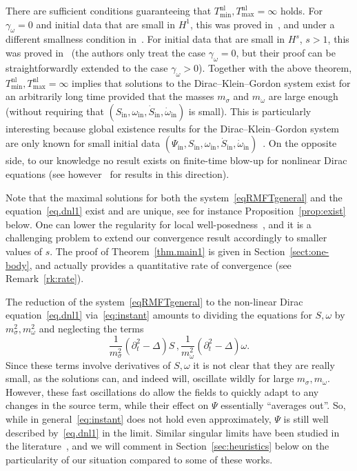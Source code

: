 \documentclass[10pt]{amsart}
\theoremstyle{definition}\newtheorem{defi}[theo]{Definition}\newtheorem{rema}[theo]{Remark}\newtheorem{exam}[theo]{Example}\newtheorem{exem}[theo]{Example}\newtheorem{nota}[theo]{Notation}
\newcommand{\rmin}{\mathrm{in}}
\newcommand{\nl}{\mathrm{nl}}
\begin{document}
There are sufficient conditions guaranteeing that $T_{\min}^{\nl}, T_{\max}^{\nl}=\infty$ holds. For $\gamma_\omega=0$ and initial data that are small in $H^1$, this was proved in~\cite{bejenaru2015}, and under a different smallness condition in~\cite{candy2018}. For initial data that are small in $H^s$, $s>1$, this was proved in~\cite{machihara2003} (the authors only treat the case $\gamma_\omega=0$, but their proof can be straightforwardly extended to the case $\gamma_\omega>0$). Together with the above theorem, $T_{\min}^{\nl}, T_{\max}^{\nl}=\infty$ implies that solutions to the Dirac--Klein--Gordon system exist for an arbitrarily long time provided that the masses $m_\sigma$ and $m_\omega$ are large enough (without requiring that $(S_\rmin,\omega_\rmin,\dot{S}_\rmin,\dot{\omega}_\rmin)$ is small). This is particularly interesting because global existence results for the Dirac--Klein--Gordon system are only known for small initial data $(\Psi_\rmin,S_\rmin,\omega_\rmin,\dot{S}_\rmin,\dot{\omega}_\rmin)$~\cite{bejenaru2017}. On the opposite side, to our knowledge no result exists on finite-time blow-up for nonlinear Dirac equations (see however~\cite{DanOka-16,HuhPel-19} for results in this direction).

Note that the maximal solutions for both the system~\eqref{eqRMFTgeneral} and the equation~\eqref{eq.dnl1} exist and are unique, see for instance Proposition~\ref{prop:exist} below. One can lower the regularity for local well-posedness~\cite{bejenaru2015,bejenaru2017,machihara2003}, and it is a challenging problem to extend our convergence result accordingly to smaller values of $s$. The proof of Theorem~\ref{thm.main1} is given in Section~\ref{sect:one-body}, and actually provides a quantitative rate of convergence (see Remark~\ref{rk:rate}).

The reduction of the system~\eqref{eqRMFTgeneral} to the non-linear Dirac equation~\eqref{eq.dnl1} via~\eqref{eq:instant} amounts to dividing the equations for $S, \omega$ by $m_\sigma^2, m_\omega^2$ and neglecting the terms
\begin{equation}
\frac{1}{m_\sigma^2}\left(\partial^2_t-\Delta\right)S\,,\frac{1}{m_\omega^2}\left(\partial^2_t-\Delta\right)\omega.
\end{equation}
Since these terms involve derivatives of $S, \omega$ it is not clear that they are really small, as the solutions can, and indeed will, oscillate wildly for large $m_\sigma, m_\omega$. However, these fast oscillations do allow the fields to quickly adapt to any changes in the source term, while their effect on $\Psi$ essentially ``averages out''. So, while in general~\eqref{eq:instant} does not hold even approximately, $\Psi$ is still well described by~\eqref{eq.dnl1} in the limit. Similar singular limits have been studied in the literature~\cite{added1988,baumstark2020,
daub2016,griesemer2017,schochet1986}, and we will comment in Section~\ref{sec:heuristics} below on the particularity of our situation compared to some of these works.
\end{document}
